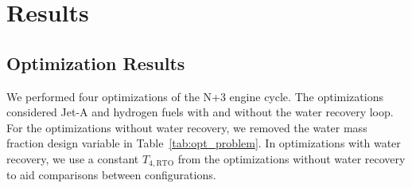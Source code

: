 \documentclass[conf]{new-aiaa}
\begin{document}
\section{Results}
\label{sec:results}

\subsection{Optimization Results}
\label{sub:opt_res}


We performed four optimizations of the N+3 engine cycle.
The optimizations considered Jet-A and hydrogen fuels with and without the water recovery loop.
For the optimizations without water recovery, we removed the water mass fraction design variable in Table~\ref{tab:opt_problem}.
In optimizations with water recovery, we use a constant $T_{4,\text{RTO}}$ from the optimizations without water recovery to aid comparisons between configurations.
\end{document}
